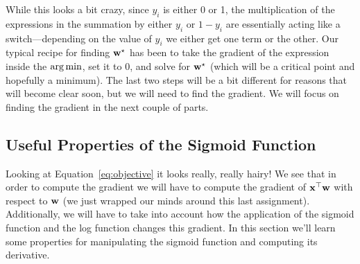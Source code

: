\documentclass[assignment04_Solutions]{subfiles}
\begin{document}
While this looks a bit crazy, since $y_i$ is either 0 or 1, the multiplication of the expressions in the summation by either $y_i$ or $1-y_i$ are essentially acting like a switch---depending on the value of $y_i$ we either get one term or the other.  Our typical recipe for finding $\mathbf{w}^\star$ has been to take the gradient of the expression inside the $\operatorname*{arg\,min}$, set it to $0$, and solve for $\mathbf{w}^\star$ (which will be a critical point and hopefully a minimum).  The last two steps will be a bit different for reasons that will become clear soon, but we will need to find the gradient.  We will focus on finding the gradient in the next couple of parts.

\subsection{Useful Properties of the Sigmoid Function}

Looking at Equation~\ref{eq:objective} it looks really, really hairy!  We see that in order to compute the gradient we will have to compute the gradient of $\mathbf{x}^\top \mathbf{w}$ with respect to $\mathbf{w}$ (we just wrapped our minds around this last assignment).  Additionally, we will have to take into account how the application of the sigmoid function and the log function changes this gradient.  In this section we'll learn some properties for manipulating the sigmoid function and computing its derivative.
\end{document}
